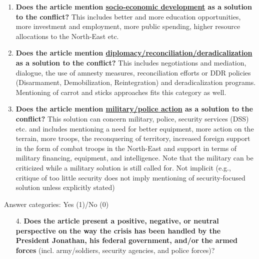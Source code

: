 \begin{enumerate}[noitemsep, font=\bfseries]
    \item \textbf{Does the article mention \underline{socio-economic development} as a solution to the conflict?} This includes better and more education opportunities, more investment and employment, more public spending, higher resource allocations to the North-East etc.
    \item \textbf{Does the article mention \underline{diplomacy/reconciliation/deradicalization} as a solution to the conflict?} This includes negotiations and mediation, dialogue, the use of amnesty measures, reconciliation efforts or DDR policies (Disarmament, Demobilization, Reintegration) and deradicalization programs. Mentioning of carrot and sticks approaches fits this category as well.
    \item \textbf{Does the article mention \underline{military/police action} as a solution to the conflict?} This solution can concern military, police, security services (DSS) etc. and includes mentioning a need for better equipment, more action on the terrain, more troops, the reconquering of territory, increased foreign support in the form of combat troops in the North-East and support in terms of military financing, equipment, and intelligence. Note that the military can be criticized while a military solution is still called for. Not implicit (e.g., critique of too little security does not imply mentioning of security-focused solution unless explicitly stated)
\end{enumerate}

\noindent Answer categories: Yes (1)/No (0)


\begin{enumerate}[noitemsep, font=\bfseries]
    \item[4.] \textbf{Does the article present a positive, negative, or neutral perspective on the way the crisis has been handled by the President Jonathan, his federal government, and/or the armed forces} (incl. army/soldiers, security agencies, and police forces)?
\end{enumerate}


